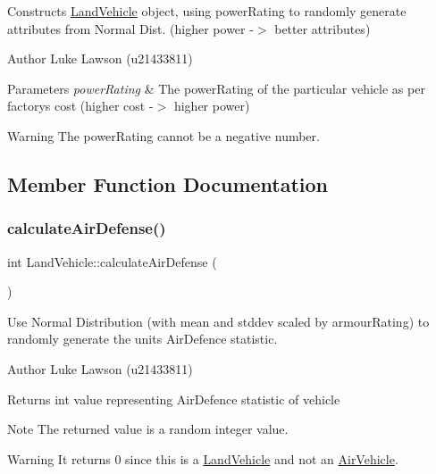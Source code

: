 Constructs \mbox{\hyperlink{class_land_vehicle}{Land\+Vehicle}} object, using power\+Rating to randomly generate attributes from Normal Dist. (higher power -\/$>$ better attributes) 

\begin{DoxyAuthor}{Author}
Luke Lawson (u21433811) 
\end{DoxyAuthor}

\begin{DoxyParams}{Parameters}
{\em power\+Rating} & The power\+Rating of the particular vehicle as per factory\textquotesingle{}s cost (higher cost -\/$>$ higher power) \\
\hline
\end{DoxyParams}
\begin{DoxyWarning}{Warning}
The power\+Rating cannot be a negative number. 
\end{DoxyWarning}


\subsection{Member Function Documentation}
\mbox{\label{class_land_vehicle_af5083b44d73c3597be9ab081d06bc7a6}} 
\subsubsection{\texorpdfstring{calculateAirDefense()}{calculateAirDefense()}}
{\footnotesize\ttfamily int Land\+Vehicle\+::calculate\+Air\+Defense (\begin{DoxyParamCaption}{ }\end{DoxyParamCaption})\hspace{0.3cm}{\ttfamily [virtual]}}



Use Normal Distribution (with mean and stddev scaled by armour\+Rating) to randomly generate the unit\textquotesingle{}s Air\+Defence statistic. 

\begin{DoxyAuthor}{Author}
Luke Lawson (u21433811) 
\end{DoxyAuthor}
\begin{DoxyReturn}{Returns}
int value representing Air\+Defence statistic of vehicle 
\end{DoxyReturn}
\begin{DoxyNote}{Note}
The returned value is a random integer value. 
\end{DoxyNote}
\begin{DoxyWarning}{Warning}
It returns 0 since this is a \mbox{\hyperlink{class_land_vehicle}{Land\+Vehicle}} and not an \mbox{\hyperlink{class_air_vehicle}{Air\+Vehicle}}. 
\end{DoxyWarning}


